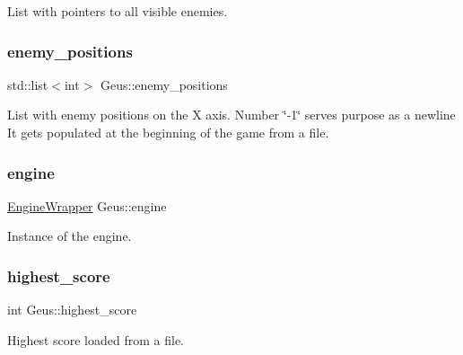 List with pointers to all visible enemies. 

\mbox{\label{classGeus_a2ecbe7a824604651a704e0fff0a5c839}} 
\subsubsection{\texorpdfstring{enemy\+\_\+positions}{enemy\_positions}}
{\footnotesize\ttfamily std\+::list$<$int$>$ Geus\+::enemy\+\_\+positions\hspace{0.3cm}{\ttfamily [private]}}

List with enemy positions on the X axis. Number \char`\"{}-\/1\char`\"{} serves purpose as a newline It gets populated at the beginning of the game from a file. \mbox{\label{classGeus_a8b87135ab61453d81b02b97d73033c92}} 
\subsubsection{\texorpdfstring{engine}{engine}}
{\footnotesize\ttfamily \hyperlink{classEngineWrapper}{Engine\+Wrapper} Geus\+::engine\hspace{0.3cm}{\ttfamily [private]}}



Instance of the engine. 

\mbox{\label{classGeus_a8b9366af73b19d4c2383b42e8c5cae7f}} 
\subsubsection{\texorpdfstring{highest\+\_\+score}{highest\_score}}
{\footnotesize\ttfamily int Geus\+::highest\+\_\+score\hspace{0.3cm}{\ttfamily [private]}}



Highest score loaded from a file. 

\mbox{\label{classGeus_aeb4cc6648c47d83e07340b39c85b62b3}} 

